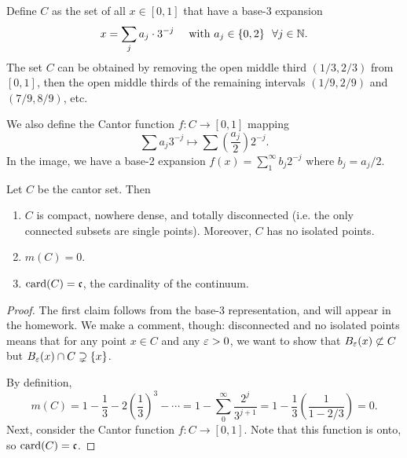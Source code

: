 \documentclass[12pt]{article} %
\begin{document}
\begin{definition}
    Define $C$ as the set of all $x \in [0,1]$ that have a base-3 expansion \[x = \sum_j a_j \cdot 3^{-j} \ \ \ \ \text{with} \ a_j \in \{0,2\} \ \ \forall j \in \mathbb{N}.\]
    The set $C$ can be obtained by removing the open middle third $(1/3, 2/3)$ from $[0,1]$, then the open middle thirds of the remaining intervals $(1/9, 2/9)$ and $(7/9, 8/9)$, etc. 
    
    We also define the Cantor function $f : C \to [0,1]$ mapping \[\sum a_j 3^{-j} \mapsto \sum \left(\frac{a_j}{2}\right) 2^{-j}.\] In the image, we have a base-2 expansion $f(x) = \sum_1^\infty b_j 2^{-j}$ where $b_j = a_j / 2$.
\end{definition}

\begin{proposition}
    Let $C$ be the cantor set. Then \begin{enumerate}
        \item $C$ is compact, nowhere dense, and totally disconnected (i.e. the only connected subsets are single points). Moreover, $C$ has no isolated points.
        \item $m(C) = 0$.
        \item $\operatorname{card}(C) = \mathfrak{c}$, the cardinality of the continuum.
    \end{enumerate}
\end{proposition}

\begin{proof}
    The first claim follows from the base-3 representation, and will appear in the homework. We make a comment, though: disconnected and no isolated points means that for any point $x \in C$ and any $\varepsilon > 0$, we want to show that $B_\varepsilon(x) \not\subset C$ but $B_\varepsilon(x) \cap C \supsetneq \{x\}$.

    By definition, \[m(C) = 1 - \frac{1}{3} - 2\left(\frac{1}{3}\right)^3 - \cdots = 1 - \sum_0^\infty \frac{2^j}{3^{j+1}} = 1 - \frac{1}{3} \left(\frac{1}{1 - 2/3}\right) = 0.\] Next, consider the Cantor function $f : C \to [0,1]$. Note that this function is onto, so $\operatorname{card}(C) = \mathfrak{c}$.
\end{proof}
\end{document}
